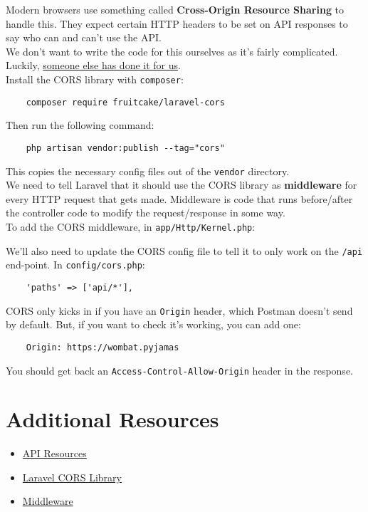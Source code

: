Modern browsers use something called \textbf{Cross-Origin Resource Sharing} to handle this. They expect certain HTTP headers to be set on API responses to say who can and can't use the API.
\\

We don't want to write the code for this ourselves as it's fairly complicated. Luckily, \href{https://github.com/fruitcake/laravel-cors}{someone else has done it for us}.
\\

Install the CORS library with \texttt{composer}:

\begin{verbatim}
    composer require fruitcake/laravel-cors
\end{verbatim}

Then run the following command:

\begin{verbatim}
    php artisan vendor:publish --tag="cors"
\end{verbatim}

This copies the necessary config files out of the \texttt{vendor} directory.
\\

We need to tell Laravel that it should use the CORS library as \textbf{middleware} for every HTTP request that gets made. Middleware is code that runs before/after the controller code to modify the request/response in some way.
\\

To add the CORS middleware, in \texttt{app/Http/Kernel.php}:


We'll also need to update the CORS config file to tell it to only work on the \texttt{/api} end-point. In \texttt{config/cors.php}:

\begin{verbatim}
    'paths' => ['api/*'],
\end{verbatim}

CORS only kicks in if you have an \texttt{Origin} header, which Postman doesn't send by default. But, if you want to check it's working, you can add one:

\begin{verbatim}
    Origin: https://wombat.pyjamas
\end{verbatim}

You should get back an \texttt{Access-Control-Allow-Origin} header in the response.



\section{Additional Resources}

\begin{itemize}[leftmargin=*]
    \item \href{https://laravel.com/docs/master/eloquent-resources}{API Resources}
    \item \href{https://github.com/barryvdh/laravel-cors}{Laravel CORS Library}
    \item \href{http://laravel.com/docs/master/middleware}{Middleware}
\end{itemize}
